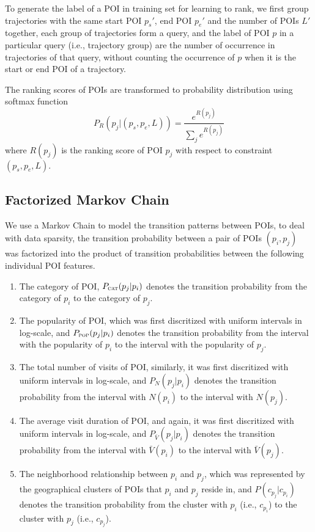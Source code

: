 To generate the label of a POI in training set for learning to rank,
we first group trajectories with the same start POI $p_s'$, end POI $p_e'$ and the number of POIs $L'$ together,
each group of trajectories form a query,
and the label of POI $p$ in a particular query (i.e., trajectory group) are the number of occurrence
in trajectories of that query,
without counting the occurrence of $p$ when it is the start or end POI of a trajectory.

The ranking scores of POIs are transformed to probability distribution using softmax function
\begin{displaymath}
    P_R(p_j |(p_s, p_e, L)) = \frac{e^{R(p_j)}}{\sum_j e^{R(p_j)}}
\end{displaymath}
where $R(p_j)$ is the ranking score of POI $p_j$ with respect to constraint $(p_s, p_e, L)$.


\subsection{Factorized Markov Chain}
\label{method:transition}
We use a Markov Chain to model the transition patterns between POIs,
to deal with data sparsity,
the transition probability between a pair of POIs $(p_i, p_j)$ was factorized into the product of
transition probabilities between the following individual POI features.
\begin{enumerate}
\item The category of POI, $P_{\textsc{cat}}(p_j | p_i)$
      denotes the transition probability from the category of $p_i$ to the category of $p_j$.
\item The popularity of POI, which was first discritized with uniform intervals in log-scale,
      and $P_{\textsc{pop}}(p_j | p_i)$ denotes the transition probability from the interval with the popularity of
      $p_i$ to the interval with the popularity of $p_j$.
\item The total number of visits of POI, similarly, it was first discritized with uniform intervals in log-scale,
      and $P_N(p_j | p_i)$ denotes the transition probability from the interval with $N(p_i)$
      to the interval with $N(p_j)$.
\item The average visit duration of POI, and again, it was first discritized with uniform intervals in log-scale,
      and $P_{\bar{V}}(p_j | p_i)$ denotes the transition probability from the interval with $\bar{V}(p_i)$
      to the interval with $\bar{V}(p_j)$.
\item The neighborhood relationship between $p_i$ and $p_j$,
      which was represented by the geographical clusters of POIs that $p_i$ and $p_j$ reside in,
      and $P(c_{p_j} | c_{p_i})$ denotes the transition probability from the cluster with
      $p_i$ (i.e., $c_{p_i}$) to the cluster with $p_j$ (i.e., $c_{p_j}$).
\end{enumerate}

